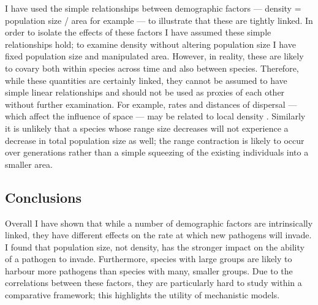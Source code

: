 
I have used the simple relationships between demographic factors --- density = population size / area for example --- to illustrate that these are tightly linked.
In order to isolate the effects of these factors I have assumed these simple relationships hold; to examine density without altering population size I have fixed population size and manipulated area.
However, in reality, these are likely to covary both within species across time and also between species.
Therefore, while these quantities are certainly linked, they cannot be assumed to have simple linear relationships and should not be used as proxies of each other without further examination.
For example, rates and distances of dispersal --- which affect the influence of space --- may be related to local density \cite{marjamaki2013local}.
Similarly it is unlikely that a species whose range size decreases will not experience a decrease in total population size as well; the range contraction is likely to occur over generations rather than a simple squeezing of the existing individuals into a smaller area.




\subsection{Conclusions}

Overall I have shown that while a number of demographic factors are intrinsically linked, they have different effects on the rate at which new pathogens will invade.
I found that population size, not density, has the stronger impact on the ability of a pathogen to invade.
Furthermore, species with large groups are likely to harbour more pathogens than species with many, smaller groups.
Due to the correlations between these factors, they are particularly hard to study within a comparative framework; this highlights the utility of mechanistic models.











